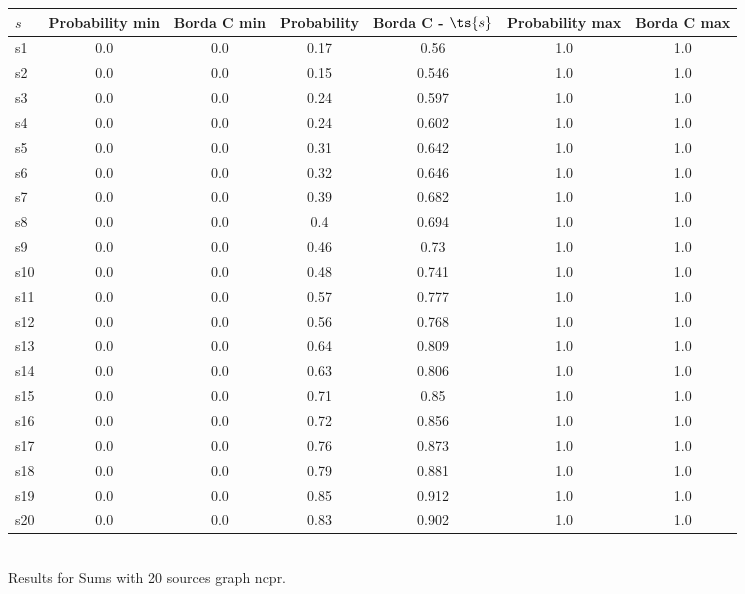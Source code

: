 \documentclass{article}
\begin{document}
\noindent\begin{tabular}{|l|c|c|c|c|c|c|}
\hline
$s$& Probability min & Borda C min & Probability & Borda C - $\ts{s}$ & Probability max & Borda C max\\
\hline
s1 &0.0 & 0.0 & 0.17 & 0.56 & 1.0 & 1.0\\
\hline
s2 &0.0 & 0.0 & 0.15 & 0.546 & 1.0 & 1.0\\
\hline
s3 &0.0 & 0.0 & 0.24 & 0.597 & 1.0 & 1.0\\
\hline
s4 &0.0 & 0.0 & 0.24 & 0.602 & 1.0 & 1.0\\
\hline
s5 &0.0 & 0.0 & 0.31 & 0.642 & 1.0 & 1.0\\
\hline
s6 &0.0 & 0.0 & 0.32 & 0.646 & 1.0 & 1.0\\
\hline
s7 &0.0 & 0.0 & 0.39 & 0.682 & 1.0 & 1.0\\
\hline
s8 &0.0 & 0.0 & 0.4 & 0.694 & 1.0 & 1.0\\
\hline
s9 &0.0 & 0.0 & 0.46 & 0.73 & 1.0 & 1.0\\
\hline
s10 &0.0 & 0.0 & 0.48 & 0.741 & 1.0 & 1.0\\
\hline
s11 &0.0 & 0.0 & 0.57 & 0.777 & 1.0 & 1.0\\
\hline
s12 &0.0 & 0.0 & 0.56 & 0.768 & 1.0 & 1.0\\
\hline
s13 &0.0 & 0.0 & 0.64 & 0.809 & 1.0 & 1.0\\
\hline
s14 &0.0 & 0.0 & 0.63 & 0.806 & 1.0 & 1.0\\
\hline
s15 &0.0 & 0.0 & 0.71 & 0.85 & 1.0 & 1.0\\
\hline
s16 &0.0 & 0.0 & 0.72 & 0.856 & 1.0 & 1.0\\
\hline
s17 &0.0 & 0.0 & 0.76 & 0.873 & 1.0 & 1.0\\
\hline
s18 &0.0 & 0.0 & 0.79 & 0.881 & 1.0 & 1.0\\
\hline
s19 &0.0 & 0.0 & 0.85 & 0.912 & 1.0 & 1.0\\
\hline
s20 &0.0 & 0.0 & 0.83 & 0.902 & 1.0 & 1.0\\
\hline
\end{tabular}\\

\noindent Results for Sums with 20 sources graph ncpr.
\end{document}
